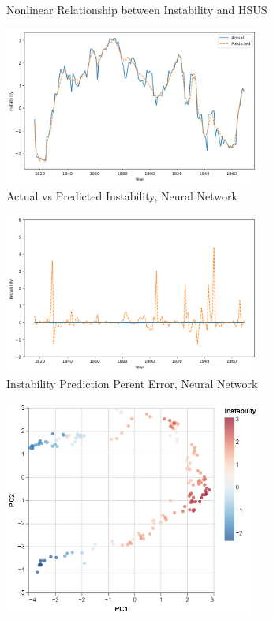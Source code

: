 \documentclass[twocolumn]{article}
\begin{document}
\begin{appendices}
\begin{figure}[h!]
    \caption{Nonlinear Relationship between Instability and HSUS}
    \label{nonlinear}
\end{figure}
\FloatBarrier
\begin{figure}[h!]
    \centering
    \includegraphics[width=0.75\textwidth]{images/predicted_instability.png}
    \caption{Actual vs Predicted Instability, Neural Network}
    \label{nn_prediction}
\end{figure}
\FloatBarrier
\begin{figure}[h!]
    \centering
    \includegraphics[width=0.75\textwidth]{images/predicted_error.png}
    \caption{Instability Prediction Perent Error, Neural Network}
    \label{nn_error}
\end{figure}
\FloatBarrier
\begin{figure}[h!]
    \centering
    \includegraphics[width=0.75\textwidth]{images/pca.png}

\end{figure}
\end{appendices}
\end{document}
